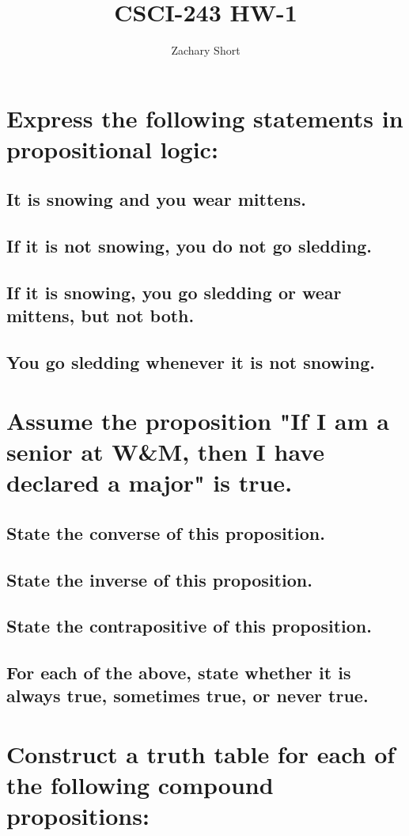 \documentclass{article}
\title{CSCI-243 HW-1}
\author{Zachary Short}
\begin{document}
\maketitle

\section{Express the following statements in propositional logic:}
    \subsection{It is snowing and you wear mittens.}
    \subsection{If it is not snowing, you do not go sledding.} 
    \subsection{If it is snowing, you go sledding or wear mittens, but not both.}
    \subsection{You go sledding whenever it is not snowing.}
\section{Assume the proposition "If I am a senior at W&M, then I have declared a major" is true.}
    \subsection{State the converse of this proposition.} 
    \subsection{State the inverse of this proposition.} 
    \subsection{State the contrapositive of this proposition.} 
    \subsection{For each of the above, state whether it is always true, sometimes true, or never true.} 
\section{Construct a truth table for each of the following compound propositions:}
\end{document}
